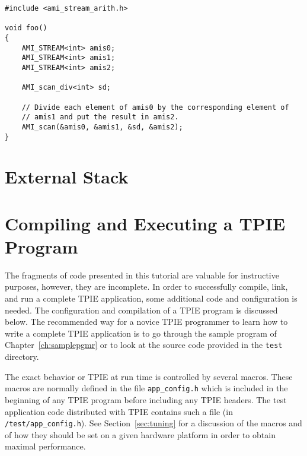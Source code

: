 \begin{verbatim}
#include <ami_stream_arith.h>

void foo()
{
    AMI_STREAM<int> amis0;
    AMI_STREAM<int> amis1;
    AMI_STREAM<int> amis2;

    AMI_scan_div<int> sd;

    // Divide each element of amis0 by the corresponding element of
    // amis1 and put the result in amis2.
    AMI_scan(&amis0, &amis1, &sd, &amis2);
}
\end{verbatim}



\section{External Stack}
\label{sec:stack}



\tobewritten

\section{Compiling and Executing a TPIE Program}
\label{sec:compiling}

The fragments of code presented in this tutorial are valuable for
instructive purposes, however, they are incomplete. In order to
successfully compile, link, and run a complete TPIE application, some
additional code and configuration is needed. The configuration and
compilation of a TPIE program is discussed below. The recommended way for a
novice TPIE programmer to learn how to write a complete TPIE application is
to go through the sample program of Chapter~\ref{ch:samplepgmr} or to look
at the source code provided in the \verb|test| directory.

The exact behavior or TPIE at run time is controlled by several
macros. These macros are normally defined in the file \verb|app_config.h|
 which is included in the beginning
of any TPIE program before including any TPIE headers. The test application
code distributed with TPIE contains such a file
(in \verb|/test/app_config.h|). See Section~\ref{sec:tuning} for a
discussion of the macros and of how they should be set on a given hardware
platform in order to obtain maximal performance.

